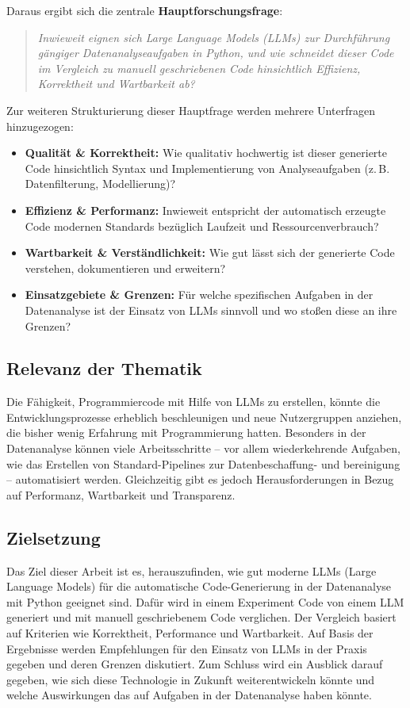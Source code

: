 \documentclass[11pt,a4paper]{article}
\begin{document}
Daraus ergibt sich die zentrale \textbf{Hauptforschungsfrage}:

\begin{quote}
    \emph{Inwieweit eignen sich Large Language Models (LLMs) zur Durchführung gängiger Datenanalyseaufgaben in Python, und wie schneidet dieser Code im Vergleich zu manuell geschriebenen Code hinsichtlich Effizienz, Korrektheit und Wartbarkeit ab?}
\end{quote}

Zur weiteren Strukturierung dieser Hauptfrage werden mehrere Unterfragen hinzugezogen:
\begin{itemize}
    \item \textbf{Qualität \& Korrektheit:} Wie qualitativ hochwertig ist dieser generierte Code hinsichtlich Syntax und Implementierung von Analyseaufgaben (z.\,B. Datenfilterung, Modellierung)?
    \item \textbf{Effizienz \& Performanz:} Inwieweit entspricht der automatisch erzeugte Code modernen Standards bezüglich Laufzeit und Ressourcenverbrauch?
    \item \textbf{Wartbarkeit \& Verständlichkeit:} Wie gut lässt sich der generierte Code verstehen, dokumentieren und erweitern?
    \item \textbf{Einsatzgebiete \& Grenzen:} Für welche spezifischen Aufgaben in der Datenanalyse ist der Einsatz von LLMs sinnvoll und wo stoßen diese an ihre Grenzen?
\end{itemize}

\subsection{Relevanz der Thematik}
Die Fähigkeit, Programmiercode mit Hilfe von LLMs zu erstellen, könnte die Entwicklungsprozesse erheblich beschleunigen und neue Nutzergruppen anziehen, die bisher wenig Erfahrung mit Programmierung hatten. Besonders in der Datenanalyse können viele Arbeitsschritte – vor allem wiederkehrende Aufgaben, wie das Erstellen von Standard-Pipelines zur Datenbeschaffung- und bereinigung – automatisiert werden. Gleichzeitig gibt es jedoch Herausforderungen in Bezug auf Performanz, Wartbarkeit und Transparenz.

\subsection{Zielsetzung}
Das Ziel dieser Arbeit ist es, herauszufinden, wie gut moderne LLMs (Large Language Models) für die automatische Code-Generierung in der Datenanalyse mit Python geeignet sind. Dafür wird in einem Experiment Code von einem LLM generiert und mit manuell geschriebenem Code verglichen. Der Vergleich basiert auf Kriterien wie Korrektheit, Performance und Wartbarkeit. Auf Basis der Ergebnisse werden Empfehlungen für den Einsatz von LLMs in der Praxis gegeben und deren Grenzen diskutiert. Zum Schluss wird ein Ausblick darauf gegeben, wie sich diese Technologie in Zukunft weiterentwickeln könnte und welche Auswirkungen das auf Aufgaben in der Datenanalyse haben könnte\cite{chen2021evaluatinglargelanguagemodels,evalplus}.
\end{document}
